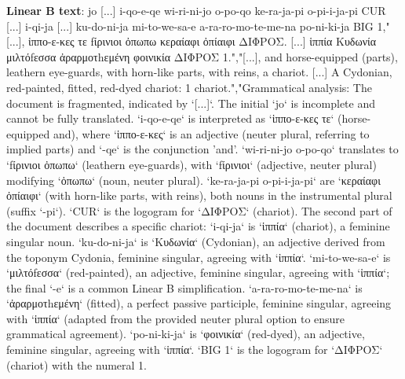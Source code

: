\textbf{Linear B text}: jo [...] i-qo-e-qe wi-ri-ni-jo o-po-qo ke-ra-ja-pi o-pi-i-ja-pi CUR [...] i-qi-ja [...] ku-do-ni-ja mi-to-we-sa-e a-ra-ro-mo-te-me-na po-ni-ki-ja BIG 1,"[...], ἱππο-ε-κες τε fίρινιοι ὀπωπω κεραίαφι ὀπίαιφι ΔΙΦΡΟΣ. [...] ἱππία Κυδωνία μιλτόfεσσα ἀραρμοτhεμένη φοινικία ΔΙΦΡΟΣ 1.","[...], and horse-equipped (parts), leathern eye-guards, with horn-like parts, with reins, a chariot. [...] A Cydonian, red-painted, fitted, red-dyed chariot: 1 chariot.","Grammatical analysis: The document is fragmented, indicated by `[...]`. The initial `jo` is incomplete and cannot be fully translated. `i-qo-e-qe` is interpreted as `ἱππο-ε-κες τε` (horse-equipped and), where `ἱππο-ε-κες` is an adjective (neuter plural, referring to implied parts) and `-qe` is the conjunction 'and'. `wi-ri-ni-jo o-po-qo` translates to `fίρινιοι ὀπωπω` (leathern eye-guards), with `fίρινιοι` (adjective, neuter plural) modifying `ὀπωπω` (noun, neuter plural). `ke-ra-ja-pi o-pi-i-ja-pi` are `κεραίαφι ὀπίαιφι` (with horn-like parts, with reins), both nouns in the instrumental plural (suffix `-pi`). `CUR` is the logogram for `ΔΙΦΡΟΣ` (chariot). The second part of the document describes a specific chariot: `i-qi-ja` is `ἱππία` (chariot), a feminine singular noun. `ku-do-ni-ja` is `Κυδωνία` (Cydonian), an adjective derived from the toponym Cydonia, feminine singular, agreeing with `ἱππία`. `mi-to-we-sa-e` is `μιλτόfεσσα` (red-painted), an adjective, feminine singular, agreeing with `ἱππία`; the final `-e` is a common Linear B simplification. `a-ra-ro-mo-te-me-na` is `ἀραρμοτhεμένη` (fitted), a perfect passive participle, feminine singular, agreeing with `ἱππία` (adapted from the provided neuter plural option to ensure grammatical agreement). `po-ni-ki-ja` is `φοινικία` (red-dyed), an adjective, feminine singular, agreeing with `ἱππία`. `BIG 1` is the logogram for `ΔΙΦΡΟΣ` (chariot) with the numeral 1. 

